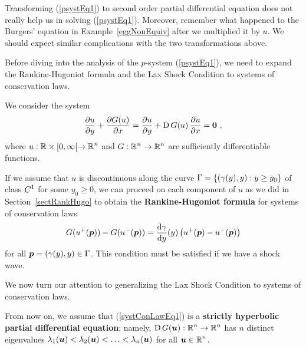\begin{egg}
Transforming (\ref{psystEq1}) to second order partial differential
equation does not really help us in solving (\ref{psystEq1}).
Moreover, remember what happened to the Burgers' equation in
Example~\ref{eggNonEquiv} after we multiplied it by $u$.  We should
expect similar complications with the two transformations above.
\end{egg}

Before diving into the analysis of the $p$-system
(\ref{psystEq1}), we need to expand the Rankine-Hugoniot formula
and the Lax Shock Condition to systems of conservation laws.

We consider the system
\begin{equation} \label{systConLawEq1}
\frac{\partial{u}}{\partial y} + \frac{\partial{G(u)}}{\partial x}
= \frac{\partial{u}}{\partial y} + \operatorname{D} G(u) \, \frac{\partial{u}}{\partial x} = {\bm{0}} \ ,
\end{equation}
where $\displaystyle u:\mathbb{R}\times [0,\infty[ \to \mathbb{R}^n$ and
$\displaystyle G:\mathbb{R}^n \to \mathbb{R}^n$
are sufficiently differentiable functions.

If we assume that $u$ is discontinuous along the curve
$\displaystyle \Gamma = \left\{ (\gamma(y),y) : y \geq y_0 \right\}$
of class $\displaystyle C^1$ for some $y_0 \geq 0$, we can proceed on
each component of $u$ as we did in Section~\ref{sectRankHugo} to obtain the
{\bfseries Rankine-Hugoniot formula}
for systems of conservation laws
\begin{equation}\label{shock_rank_hugND}
G(u^+({\bm{p}}))-G(u^-({\bm{p}}))
= \frac{\mathrm{d}\gamma}{\mathrm{d}{y}}(y) \left(u^+({\bm{p}}) - u^-({\bm{p}}) \right)
\end{equation}
for all ${\bm{p}}=(\gamma(y),y) \in \Gamma$.  This condition must be
satisfied if we have a shock wave.

We now turn our attention to generalizing the Lax Shock Condition
to systems of conservation laws.

From now on, we assume that (\ref{systConLawEq1}) is a
{\bfseries strictly hyperbolic partial differential
equation};
namely, $\displaystyle \operatorname{D} G({\bm{u}}) :\mathbb{R}^n \to \mathbb{R}^n$ has $n$
distinct eigenvalues
$\lambda_1({\bm{u}}) < \lambda_2({\bm{u}}) < \ldots < \lambda_n({\bm{u}})$
for all $\displaystyle {\bm{u}} \in \mathbb{R}^n$.

